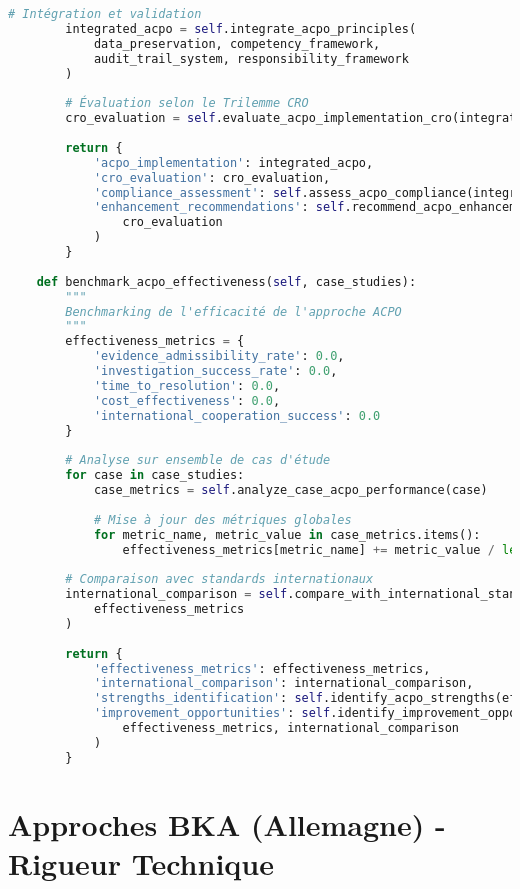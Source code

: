 \begin{lstlisting}[language=Python, caption=Implémentation des principes ACPO avec validation CRO]
        # Intégration et validation
        integrated_acpo = self.integrate_acpo_principles(
            data_preservation, competency_framework, 
            audit_trail_system, responsibility_framework
        )
        
        # Évaluation selon le Trilemme CRO
        cro_evaluation = self.evaluate_acpo_implementation_cro(integrated_acpo)
        
        return {
            'acpo_implementation': integrated_acpo,
            'cro_evaluation': cro_evaluation,
            'compliance_assessment': self.assess_acpo_compliance(integrated_acpo),
            'enhancement_recommendations': self.recommend_acpo_enhancements(
                cro_evaluation
            )
        }
    
    def benchmark_acpo_effectiveness(self, case_studies):
        """
        Benchmarking de l'efficacité de l'approche ACPO
        """
        effectiveness_metrics = {
            'evidence_admissibility_rate': 0.0,
            'investigation_success_rate': 0.0,
            'time_to_resolution': 0.0,
            'cost_effectiveness': 0.0,
            'international_cooperation_success': 0.0
        }
        
        # Analyse sur ensemble de cas d'étude
        for case in case_studies:
            case_metrics = self.analyze_case_acpo_performance(case)
            
            # Mise à jour des métriques globales
            for metric_name, metric_value in case_metrics.items():
                effectiveness_metrics[metric_name] += metric_value / len(case_studies)
                
        # Comparaison avec standards internationaux
        international_comparison = self.compare_with_international_standards(
            effectiveness_metrics
        )
        
        return {
            'effectiveness_metrics': effectiveness_metrics,
            'international_comparison': international_comparison,
            'strengths_identification': self.identify_acpo_strengths(effectiveness_metrics),
            'improvement_opportunities': self.identify_improvement_opportunities(
                effectiveness_metrics, international_comparison
            )
        }
\end{lstlisting}

\section{Approches BKA (Allemagne) - Rigueur Technique}

